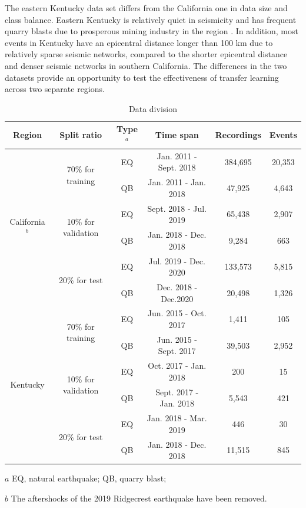 \documentclass{gji}
\begin{document}
The eastern Kentucky data set differs from the California one in data size and class balance. Eastern Kentucky is relatively quiet in seismicity and has frequent quarry blasts due to prosperous mining industry in the region \citep{carpenter}. In addition, most events in Kentucky have an epicentral distance longer than 100 km due to relatively sparse seismic networks, compared to the shorter epicentral distance and denser seismic networks in southern California. The differences in the two datasets provide an opportunity to test the effectiveness of transfer learning across two separate regions.
\begin{table}
\caption{Data division}
\label{division}
\begin{threeparttable}[b]
    \begin{tabular}{cccccc}
    \toprule[1pt]
    Region & Split ratio & Type$^a$  & Time span & Recordings & Events \\
    \midrule
    \multirow{6}[2]{*}{California$^b$} & \multirow{2}[1]{*}{70\% for training} & EQ    & Jan. 2011 - Sept. 2018 & 384,695 & 20,353 \\
          &       & QB    & Jan. 2011 - Jan. 2018 & 47,925 & 4,643 \\
          & \multirow{2}[0]{*}{10\% for validation} & EQ    & Sept. 2018 - Jul. 2019 & 65,438 & 2,907 \\
          &       & QB    & Jan. 2018 - Dec. 2018 & 9,284 & 663 \\
          & \multirow{2}[1]{*}{20\% for test} & EQ    & Jul. 2019 - Dec. 2020 & 133,573 & 5,815 \\
          &       & QB    & Dec. 2018 - Dec.2020 & 20,498 & 1,326 \\
    \midrule
    \multirow{6}[2]{*}{Kentucky} & \multirow{2}[1]{*}{70\% for training} & EQ    &  Jun. 2015 - Oct. 2017 & 1,411 & 105 \\
          &       & QB    &  Jun. 2015 - Sept. 2017 & 39,503 & 2,952 \\
          & \multirow{2}[0]{*}{10\% for validation} & EQ    &  Oct. 2017 - Jan. 2018 & 200   & 15 \\
          &       & QB    & Sept. 2017 - Jan. 2018 & 5,543 & 421 \\
          & \multirow{2}[1]{*}{20\% for test} & EQ    & Jan. 2018 - Mar. 2019 & 446   & 30 \\
          &       & QB    & Jan. 2018 - Dec. 2018 & 11,515 & 845 \\
    \bottomrule[1pt]
    \end{tabular}%
     \begin{tablenotes}
     \item[$a$] EQ, natural earthquake; QB, quarry blast;
     \item[$b$] The aftershocks of the 2019 Ridgecrest earthquake have been removed.
   \end{tablenotes}
\end{threeparttable}
\end{table}
\end{document}
